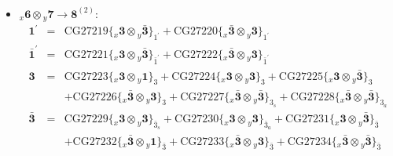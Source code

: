 \documentclass[english]{article}
\newcommand{\rep}[1]{\mathbf{#1}}
\newcommand{\repx}[2]{{}_{#2}\mathbf{#1}}
\newcommand{\subcg}[3]{\big\{ \repx{#1}{x}\otimes\repx{#2}{y}\big\}^{}_{#3}}
\begin{document}
\begin{itemize}
\begin{eqnarray*}
\end{eqnarray*}
\item $\repx{6}{x}\otimes\repx{7}{y}\to\rep{8}^{(2)}$:
\begin{eqnarray*}
\rep{1^{\prime}} &=& \text{CG27219}\subcg{3}{\bar{3}}{1^{\prime}}+\text{CG27220}\subcg{\bar{3}}{3}{1^{\prime}}
\\
\rep{\bar{1}^{\prime}} &=& \text{CG27221}\subcg{3}{\bar{3}}{\bar{1}^{\prime}}+\text{CG27222}\subcg{\bar{3}}{3}{\bar{1}^{\prime}}
\\
\rep{3} &=& \text{CG27223}\subcg{3}{1}{3}+\text{CG27224}\subcg{3}{3}{3}+\text{CG27225}\subcg{3}{\bar{3}}{3} \\ 
 & & +\text{CG27226}\subcg{\bar{3}}{3}{3}+\text{CG27227}\subcg{\bar{3}}{\bar{3}}{3_{s}}+\text{CG27228}\subcg{\bar{3}}{\bar{3}}{3_{a}}
\\
\rep{\bar{3}} &=& \text{CG27229}\subcg{3}{3}{\bar{3}_{s}}+\text{CG27230}\subcg{3}{3}{\bar{3}_{a}}+\text{CG27231}\subcg{3}{\bar{3}}{\bar{3}} \\ 
 & & +\text{CG27232}\subcg{\bar{3}}{1}{\bar{3}}+\text{CG27233}\subcg{\bar{3}}{3}{\bar{3}}+\text{CG27234}\subcg{\bar{3}}{\bar{3}}{\bar{3}}
\end{eqnarray*}
\end{itemize}
\end{document}
